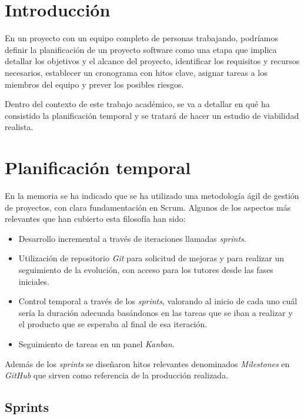
\section{Introducción}

En un proyecto con un equipo completo de personas trabajando, podríamos definir la planificación de un proyecto software como una etapa que implica detallar los objetivos y el alcance del proyecto, identificar los requisitos y recursos necesarios, establecer un cronograma con hitos clave, asignar tareas a los miembros del equipo y prever los posibles riesgos. 

Dentro del contexto de este trabajo académico, se va a detallar en qué ha consistido la planificación temporal y se tratará de hacer un estudio de viabilidad realista.


\section{Planificación temporal}

En la memoria se ha indicado que se ha utilizado una metodología ágil de gestión de proyectos, con clara fundamentación en Scrum\citep{wiki:scrum}. Algunos de los aspectos más relevantes que han cubierto esta filosofía han sido:

\begin{itemize}
\tightlist
\item  
Desarrollo incremental a través de iteraciones llamadas \emph{sprints}.
\item
Utilización de repositorio \emph{Git} para solicitud de mejoras y para realizar un seguimiento de la evolución, con acceso para los tutores desde las fases iniciales. 
\item
Control temporal a través de los \emph{sprints}, valorando al inicio de cada uno 
cuál sería la duración adecuada basándonos en las tareas que se iban a realizar y el producto que se esperaba al final de esa iteración. 
\item
Seguimiento de tareas en un panel \emph{Kanban}.
\end{itemize}

Además de los \emph{sprints} se diseñaron hitos relevantes denominados \emph{Milestones} en \emph{GitHub} que sirven como referencia de la producción realizada. 

\subsection{Sprints}

